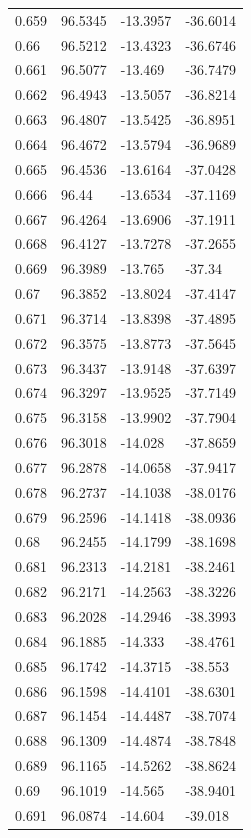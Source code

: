 \begin{tabular}{llll}
0.659 & 96.5345 & -13.3957 & -36.6014 \\
0.66 & 96.5212 & -13.4323 & -36.6746 \\
0.661 & 96.5077 & -13.469 & -36.7479 \\
0.662 & 96.4943 & -13.5057 & -36.8214 \\
0.663 & 96.4807 & -13.5425 & -36.8951 \\
0.664 & 96.4672 & -13.5794 & -36.9689 \\
0.665 & 96.4536 & -13.6164 & -37.0428 \\
0.666 & 96.44 & -13.6534 & -37.1169 \\
0.667 & 96.4264 & -13.6906 & -37.1911 \\
0.668 & 96.4127 & -13.7278 & -37.2655 \\
0.669 & 96.3989 & -13.765 & -37.34 \\
0.67 & 96.3852 & -13.8024 & -37.4147 \\
0.671 & 96.3714 & -13.8398 & -37.4895 \\
0.672 & 96.3575 & -13.8773 & -37.5645 \\
0.673 & 96.3437 & -13.9148 & -37.6397 \\
0.674 & 96.3297 & -13.9525 & -37.7149 \\
0.675 & 96.3158 & -13.9902 & -37.7904 \\
0.676 & 96.3018 & -14.028 & -37.8659 \\
0.677 & 96.2878 & -14.0658 & -37.9417 \\
0.678 & 96.2737 & -14.1038 & -38.0176 \\
0.679 & 96.2596 & -14.1418 & -38.0936 \\
0.68 & 96.2455 & -14.1799 & -38.1698 \\
0.681 & 96.2313 & -14.2181 & -38.2461 \\
0.682 & 96.2171 & -14.2563 & -38.3226 \\
0.683 & 96.2028 & -14.2946 & -38.3993 \\
0.684 & 96.1885 & -14.333 & -38.4761 \\
0.685 & 96.1742 & -14.3715 & -38.553 \\
0.686 & 96.1598 & -14.4101 & -38.6301 \\
0.687 & 96.1454 & -14.4487 & -38.7074 \\
0.688 & 96.1309 & -14.4874 & -38.7848 \\
0.689 & 96.1165 & -14.5262 & -38.8624 \\
0.69 & 96.1019 & -14.565 & -38.9401 \\
0.691 & 96.0874 & -14.604 & -39.018 \\

\end{tabular}
